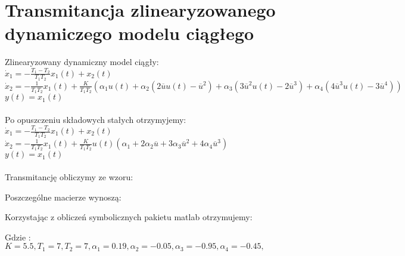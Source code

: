 \documentclass[a4paper, 11pt]{article}
\begin{document}
\section{Transmitancja zlinearyzowanego dynamiczego modelu ciągłego}
Zlinearyzowany dynamiczny model ciągły: 
\\

$\dot{x}_1 = -\frac{T_{1}-T_{2}}{T_{1}T_{2}}x_{1}(t) +x_{2}(t)$
\\

$\dot{x}_2 = -\frac{1}{T_{1}T_{2}}x_{1}(t) + \frac{K}{T_{1}T_{2}}(\alpha_1u(t)+\alpha_2(2\overline{u}u(t) - \overline{u}^2)+ \alpha_3(3\overline{u}^2u(t)-2\overline{u}^3) + \alpha_4(4\overline{u}^3u(t) - 3\overline{u}^4))$
\\

$y(t) = x_{1}(t)$
\\
\\

Po opuszczeniu składowych stałych otrzymyjemy: 
\\

$\dot{x}_1 = -\frac{T_{1}-T_{2}}{T_{1}T_{2}}x_{1}(t) +x_{2}(t)$
\\

$\dot{x}_2 = -\frac{1}{T_{1}T_{2}}x_{1}(t) + \frac{K}{T_{1}T_{2}}u(t)(\alpha_1+2\alpha_2\overline{u}+3\alpha_3\overline{u}^2+4\alpha_4\overline{u}^3)$
\\

$y(t) = x_{1}(t)$
\\
\\

Transmitancję obliczymy ze wzoru: 

Poszczególne macierze wynoszą: 

Korzystając z obliczeń symbolicznych pakietu matlab otrzymujemy: 




Gdzie : \\

$K  = 5.5, T_1 = 7, T_2 = 7, \alpha_1 = 0.19, \alpha_2 = -0.05, \alpha_3 = -0.95, \alpha_4 = -0.45,$
\\
\end{document}
